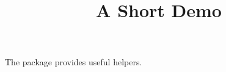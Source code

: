 \documentclass[article]{jss}
\title{A Short Demo}
\begin{document}
The  package provides useful helpers.
\end{document}
